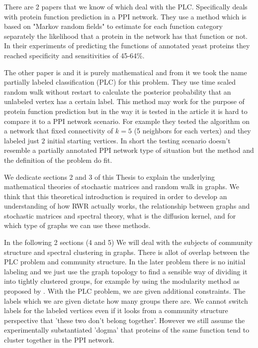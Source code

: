 \documentclass[a4paper,10pt]{article}
\theoremstyle{definition}
\theoremstyle{remark}
\theoremstyle{plain}
\begin{document}
There are 2 papers that we know of which deal with the PLC.
\textcite{deng2002prediction} Specifically deals with protein
function prediction in a PPI network.
They use a method which is based on "Markov random fields" to
estimate for each function category separately the likelihood that a
protein in the network has that function or not. In their
experiments of predicting the functions of annotated yeast proteins
they reached specificity and sensitivities of 45-64\%.

The other paper is \textcite{szummer2002partially} and it is purely
mathematical and from it we took the name partially labeled
classification (PLC) for this problem. They use time scaled random
walk without restart to calculate the posterior probability that an
unlabeled vertex has a certain label. This method may work for the
purpose of protein function prediction but in the way it is tested
in the article it is hard to compare it to a PPI network scenario.
For example they tested the algorithm on a network that fixed
connectivity of $k=5$ (5 neighbors for each vertex) and they labeled
just $2$ initial starting vertices. In short the testing scenario
doesn't resemble a partially annotated PPI network type of situation
but the method and the definition of the problem do fit.

We dedicate sections 2 and 3 of this Thesis to explain the
underlying mathematical theories of stochastic matrices and random
walk in graphs. We think that this theoretical introduction is
required in order to develop an understanding of how RWR actually
works, the relationship between graphs and stochastic matrices and
spectral theory, what is the diffusion kernel, and for which type of
graphs we can use these methods.

In the following 2 sections (4 and 5) We will deal with the subjects
of community structure and spectral clustering in graphs. There is
allot of overlap between the PLC problem and community structure. In
the later problem there is no initial labeling and we just use the
graph topology to find a sensible way of dividing it into tightly
clustered groups, for example by using the modularity method as
proposed by \textcite{newman2006modularity}. With the PLC problem,
we are given additional constraints. The labels which we are given
dictate how many groups there are. We cannot switch labels for the
labeled vertices even if it looks from a community structure
perspective that 'these two don't belong together'. However we still
assume the experimentally substantiated 'dogma' that proteins of the
same function tend to cluster together in the PPI network.
\end{document}
